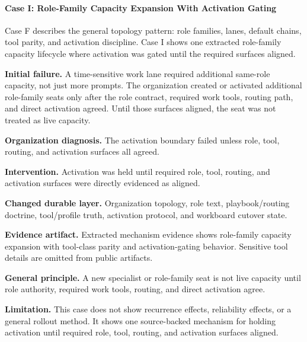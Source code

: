 \documentclass[
]{article}
\begin{document}
\paragraph{Case I: Role-Family Capacity Expansion With Activation Gating}\label{case-i-role-family-capacity-expansion-with-activation-gating}

Case F describes the general topology pattern: role families, lanes, default chains, tool parity, and activation discipline. Case I shows one extracted role-family capacity lifecycle where activation was gated until the required surfaces aligned.

\textbf{Initial failure.} A time-sensitive work lane required additional same-role capacity, not just more prompts. The organization created or activated additional role-family seats only after the role contract, required work tools, routing path, and direct activation agreed. Until those surfaces aligned, the seat was not treated as live capacity.

\textbf{Organization diagnosis.} The activation boundary failed unless role, tool, routing, and activation surfaces all agreed.

\textbf{Intervention.} Activation was held until required role, tool, routing, and activation surfaces were directly evidenced as aligned.

\textbf{Changed durable layer.} Organization topology, role text, playbook/routing doctrine, tool/profile truth, activation protocol, and workboard cutover state.

\textbf{Evidence artifact.} Extracted mechanism evidence shows role-family capacity expansion with tool-class parity and activation-gating behavior. Sensitive tool details are omitted from public artifacts.

\textbf{General principle.} A new specialist or role-family seat is not live capacity until role authority, required work tools, routing, and direct activation agree.

\textbf{Limitation.} This case does not show recurrence effects, reliability effects, or a general rollout method. It shows one source-backed mechanism for holding activation until required role, tool, routing, and activation surfaces aligned.


\end{document}
